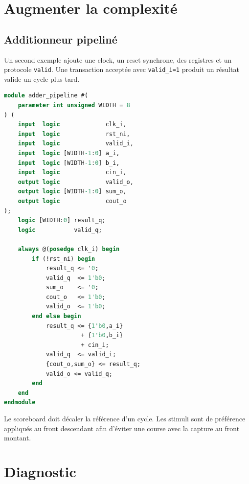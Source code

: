 \documentclass[11pt,a4paper,openany]{report}
\begin{document}
\chapter{Augmenter la complexité}

\section{Additionneur pipeliné}

Un second exemple ajoute une clock, un reset synchrone, des registres et un
protocole \texttt{valid}. Une transaction acceptée avec
\texttt{valid\_i=1} produit un résultat valide un cycle plus tard.

\begin{lstlisting}[style=guidecode,language=SystemVerilog,
caption={Structure simplifiée du pipeline}]
module adder_pipeline #(
    parameter int unsigned WIDTH = 8
) (
    input  logic             clk_i,
    input  logic             rst_ni,
    input  logic             valid_i,
    input  logic [WIDTH-1:0] a_i,
    input  logic [WIDTH-1:0] b_i,
    input  logic             cin_i,
    output logic             valid_o,
    output logic [WIDTH-1:0] sum_o,
    output logic             cout_o
);
    logic [WIDTH:0] result_q;
    logic           valid_q;

    always @(posedge clk_i) begin
        if (!rst_ni) begin
            result_q <= '0;
            valid_q  <= 1'b0;
            sum_o    <= '0;
            cout_o   <= 1'b0;
            valid_o  <= 1'b0;
        end else begin
            result_q <= {1'b0,a_i}
                      + {1'b0,b_i}
                      + cin_i;
            valid_q  <= valid_i;
            {cout_o,sum_o} <= result_q;
            valid_o <= valid_q;
        end
    end
endmodule
\end{lstlisting}

Le scoreboard doit décaler la référence d'un cycle. Les stimuli sont de
préférence appliqués au front descendant afin d'éviter une course avec la
capture au front montant.

\chapter{Diagnostic}
\end{document}
